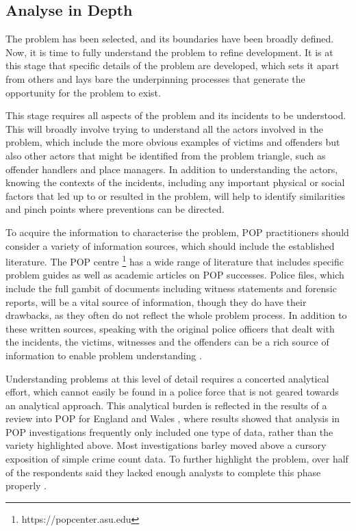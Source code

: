 \subsection{Analyse in Depth} The problem has been selected, and its boundaries have been broadly defined. Now, it is time to fully understand the problem to refine development. It is at this stage that specific details of the problem are developed, which sets it apart from others and lays bare the underpinning processes that generate the opportunity for the problem to exist.

This stage requires all aspects of the problem and its incidents to be understood\parencite{clarke2003becoming}. This will broadly involve trying to understand all the actors involved in the problem, which include the more obvious examples of victims and offenders but also other actors that might be identified from the problem triangle, such as offender handlers and place managers. In addition to understanding the actors, knowing the contexts of the incidents, including any important physical or social factors that led up to or resulted in the problem, will help to identify similarities and pinch points where preventions can be directed.

To acquire the information to characterise the problem, POP practitioners should consider a variety of information sources, which should include the established literature. The POP centre \footnote{https://popcenter.asu.edu} has a wide range of literature that includes specific problem guides as well as academic articles on POP successes. Police files, which include the full gambit of documents including witness statements and forensic reports, will be a vital source of information, though they do have their drawbacks, as they often do not reflect the whole problem process. In addition to these written sources, speaking with the original police officers that dealt with the incidents, the victims, witnesses and the offenders can be a rich source of information to enable problem understanding \parencite{goldstein1990}. 

Understanding problems at this level of detail requires a concerted analytical effort, which cannot easily be found in a police force that is not geared towards an analytical approach. This analytical burden is reflected in the results of a review into POP for England and Wales \parencite{POPUCL}, where results showed that analysis in POP investigations frequently only included one type of data, rather than the variety highlighted above. Most investigations barley moved above a cursory exposition of simple crime count data. To further highlight the problem, over half of the respondents said they lacked enough analysts to complete this phase properly \parencite{POPUCL}. 

